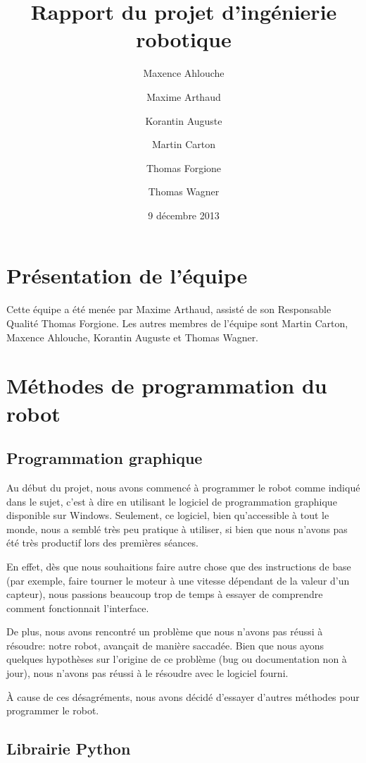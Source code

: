 \documentclass{scrartcl}
\author{Maxence Ahlouche \and Maxime Arthaud \and Korantin Auguste
  \and Martin Carton \and Thomas Forgione \and Thomas Wagner}
\title{Rapport du projet d'ingénierie robotique}
\date{9 décembre 2013}
\begin{document}
\maketitle
\tableofcontents
\newpage

\section{Présentation de l'équipe}
Cette équipe a été menée par Maxime Arthaud, assisté de son Responsable
Qualité Thomas Forgione. Les autres membres de l'équipe sont Martin Carton,
Maxence Ahlouche, Korantin Auguste et Thomas Wagner.

\section{Méthodes de programmation du robot}
\subsection{Programmation graphique}

Au début du projet, nous avons commencé à programmer le robot comme
indiqué dans le sujet, c'est à dire en utilisant le logiciel de programmation
graphique disponible sur Windows. Seulement, ce logiciel, bien
qu'accessible à tout le monde, nous a semblé très peu pratique %
à utiliser, si bien que nous n'avons pas été très productif lors des
premières séances.

En effet, dès que nous souhaitions faire autre
chose que des instructions de base (par exemple, faire tourner le
moteur à une vitesse dépendant de la valeur d'un capteur), nous
passions beaucoup trop de temps à essayer de comprendre comment fonctionnait
l'interface.

De plus, nous avons rencontré un problème que nous n'avons pas réussi
à résoudre: notre robot, avançait de manière saccadée. Bien que nous ayons
quelques hypothèses sur l'origine de ce problème (bug ou documentation non à
jour), nous n'avons pas réussi à le résoudre avec le logiciel fourni.

À cause de ces désagréments, nous avons décidé d'essayer
d'autres méthodes pour programmer le robot.

\subsection{Librairie Python}
\end{document}
